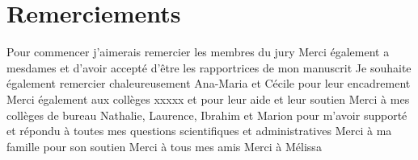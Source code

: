 \section*{Remerciements}

Pour commencer j'aimerais remercier les membres du jury
%
Merci également a mesdames  et 
d'avoir accepté d'être les rapportrices de mon manuscrit
%
Je souhaite également remercier chaleureusement Ana-Maria et Cécile
pour leur encadrement
%
Merci également aux collèges xxxxx et pour leur aide et leur soutien
%
Merci à mes collèges de bureau Nathalie, Laurence, Ibrahim et Marion
pour m'avoir supporté et répondu à toutes mes questions scientifiques
et administratives
%
Merci à ma famille pour son soutien
%
Merci à tous mes amis
%
Merci à Mélissa